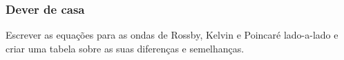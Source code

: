 \begin{frame}
\frametitle{Dever de casa}
    Escrever as equações para as ondas de Rossby, Kelvin e Poincaré lado-a-lado e criar uma
    tabela sobre as suas diferenças e semelhanças.
\end{frame}


